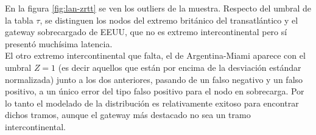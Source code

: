 En la figura \ref{fig:lan-zrtt} se ven los outliers de la muestra. Respecto del umbral de la tabla $\tau$, se distinguen los nodos del extremo británico del transatlántico y el gateway sobrecargado de EEUU, que no es extremo intercontinental pero sí presentó muchísima latencia. \\

El otro extremo intercontinental que falta, el de Argentina-Miami aparece con el umbral $Z=1$ (es decir aquellos que están por encima de la desviación estándar normalizada) junto a los dos anteriores, pasando de un falso negativo y un falso positivo, a un único error del tipo falso positivo para el nodo en sobrecarga. Por lo tanto el modelado de la distribución es relativamente exitoso para encontrar dichos tramos, aunque el gateway más destacado no sea un tramo intercontinental.
